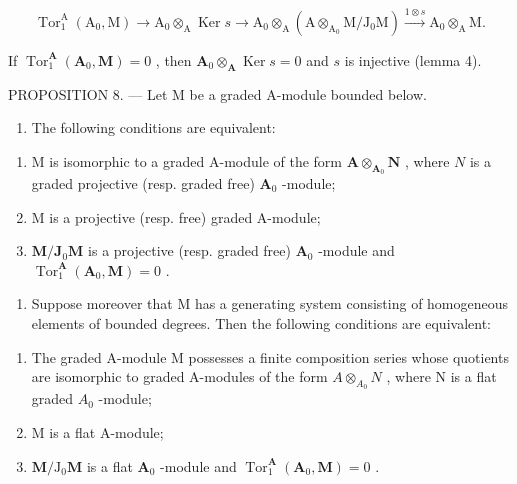 \[
\operatorname{Tor} _ {1} ^ {\mathrm{A}} \left(\mathrm{A} _ {0}, \mathrm{M}\right)\rightarrow \mathrm{A} _ {0} \otimes_ {\mathrm{A}} \operatorname{Ker} s \rightarrow \mathrm{A} _ {0} \otimes_ {\mathrm{A}} \left(\mathrm{A} \otimes_ {\mathrm{A} _ {0}} \mathrm{M} / \mathrm{J} _ {0} \mathrm{M}\right) \xrightarrow {1 \otimes s} \mathrm{A} _ {0} \otimes_ {\mathrm{A}} \mathrm{M}.
\]

If \(\operatorname{Tor}_1^{\mathbf{A}}(\mathbf{A}_0, \mathbf{M}) = 0\) , then \(\mathbf{A}_0 \otimes_{\mathbf{A}} \operatorname{Ker} s = 0\) and \(s\) is injective (lemma 4).

PROPOSITION 8. --- Let M be a graded A-module bounded below.

\begin{enumerate}
\def\labelenumi{\alph{enumi})}
\tightlist
\item
  The following conditions are equivalent:
\end{enumerate}

\begin{enumerate}
\def\labelenumi{(\roman{enumi})}
\item
  M is isomorphic to a graded A-module of the form \(\mathbf{A} \otimes_{\mathbf{A}_0} \mathbf{N}\) , where \(N\) is a graded projective (resp. graded free) \(\mathbf{A}_0\) -module;
\item
  M is a projective (resp. free) graded A-module;
\item
  \(\mathbf{M} / \mathbf{J}_0\mathbf{M}\) is a projective (resp. graded free) \(\mathbf{A}_0\) -module and \(\operatorname{Tor}_1^{\mathbf{A}}(\mathbf{A}_0,\mathbf{M}) = 0\) .
\end{enumerate}

\begin{enumerate}
\def\labelenumi{\alph{enumi})}
\setcounter{enumi}{1}
\tightlist
\item
  Suppose moreover that M has a generating system consisting of homogeneous elements of bounded degrees. Then the following conditions are equivalent:
\end{enumerate}

\begin{enumerate}
\def\labelenumi{(\roman{enumi})}
\item
  The graded A-module M possesses a finite composition series whose quotients are isomorphic to graded A-modules of the form \(A \otimes_{A_{0}} N\) , where N is a flat graded \(A_{0}\) -module;
\item
  M is a flat A-module;
\item
  \(\mathbf{M} / \mathrm{J}_0\mathbf{M}\) is a flat \(\mathbf{A}_0\) -module and \(\operatorname{Tor}_1^{\mathbf{A}}(\mathbf{A}_0,\mathbf{M}) = 0\) .
\end{enumerate}

